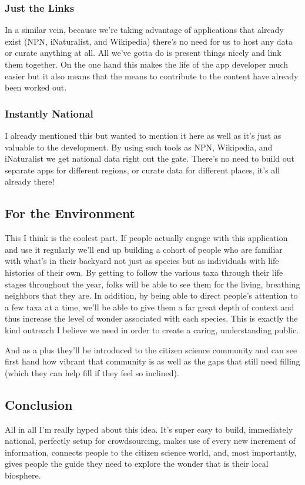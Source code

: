 \documentclass[10pt,a5paper]{book}
\begin{document}
\subsubsection{Just the Links}
In a similar vein, because we're taking advantage of applications that already exist (NPN, iNaturalist, and Wikipedia) there's no need for us to host any data or curate anything at all. All we've gotta do is present things nicely and link them together. On the one hand this makes the life of the app developer much easier but it also means that the means to contribute to the content have already been worked out. 

\subsubsection{Instantly National}
I already mentioned this but wanted to mention it here as well as it's just as valuable to the development. By using such tools as NPN, Wikipedia, and iNaturalist we get national data right out the gate. There's no need to build out separate apps for different regions, or curate data for different places, it's all already there!

\subsection{For the Environment}
This I think is the coolest part. If people actually engage with this application and use it regularly we'll end up building a cohort of people who are familiar with what's in their backyard not just as species but as individuals with life histories of their own. By getting to follow the various taxa through their life stages throughout the year, folks will be able to see them for the living, breathing neighbors that they are. In addition, by being able to direct people's attention to a few taxa at a time, we'll be able to give them a far great depth of context and thus increase the level of wonder associated with each species. This is exactly the kind outreach I believe we need in order to create a caring, understanding public. 

And as a plus they'll be introduced to the citizen science community and can see first hand how vibrant that community is as well as the gaps that still need filling (which they can help fill if they feel so inclined). 

\subsection{Conclusion}
All in all I'm really hyped about this idea. It's super easy to build, immediately national, perfectly setup for crowdsourcing, makes use of every new increment of information, connects people to the citizen science world, and, most importantly, gives people the guide they need to explore the wonder that is their local biosphere.
\end{document}
